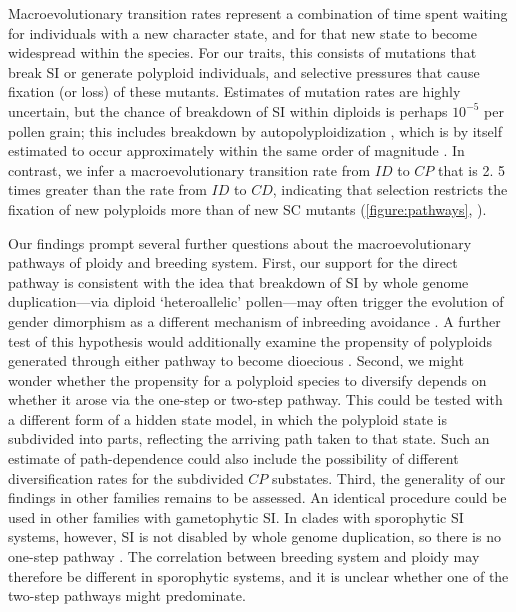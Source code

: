 Macroevolutionary transition rates represent a combination of time spent waiting for individuals with a new character state, and for that new state to become widespread within the species.
For our traits, this consists of mutations that break SI or generate polyploid individuals, and selective pressures that cause fixation (or loss) of these mutants.
Estimates of mutation rates are highly uncertain, but the chance of breakdown of SI within diploids is perhaps $10^{-5}$ per pollen grain; this includes breakdown by autopolyploidization \citep{lewis1979}, which is by itself estimated to occur approximately within the same order of magnitude \citep{ramsey_1998}. 
In contrast, we infer a macroevolutionary transition rate from $ID$ to $CP$ that is 2. 5 times greater than the rate from $ID$ to $CD$, indicating that selection restricts the fixation of new polyploids more than of new SC mutants  (\cref{figure:pathways}, \citealt{robertson_2011}). 

Our findings prompt several further questions about the macroevolutionary pathways of ploidy and breeding system.
%
First, our support for the direct pathway is consistent with the idea that breakdown of SI by whole genome duplication---via diploid `heteroallelic' pollen---may often trigger the evolution of gender dimorphism as a different mechanism of inbreeding avoidance \citep{miller_2000}.
A further test of this hypothesis would additionally examine the propensity of polyploids generated through either pathway to become dioecious \citep{robertson_2011}.
Second, we might wonder whether the propensity for a polyploid species to diversify depends on whether it arose via the one-step or two-step pathway.
This could be tested with a different form of a hidden state model, in which the polyploid state is subdivided into parts, reflecting the arriving path taken to that state. %
Such an estimate of path-dependence could also include the possibility of different diversification rates for the subdivided $CP$ substates.
Third, the generality of our findings in other families remains to be assessed.
An identical procedure could be used in other families with gametophytic SI.
In clades with sporophytic SI systems, however, SI is not disabled by whole genome duplication, so there is no one-step pathway \citep{miller_2000,mable_2004}.
The correlation between breeding system and ploidy may therefore be different in sporophytic systems, and it is unclear whether one of the two-step pathways might predominate.

